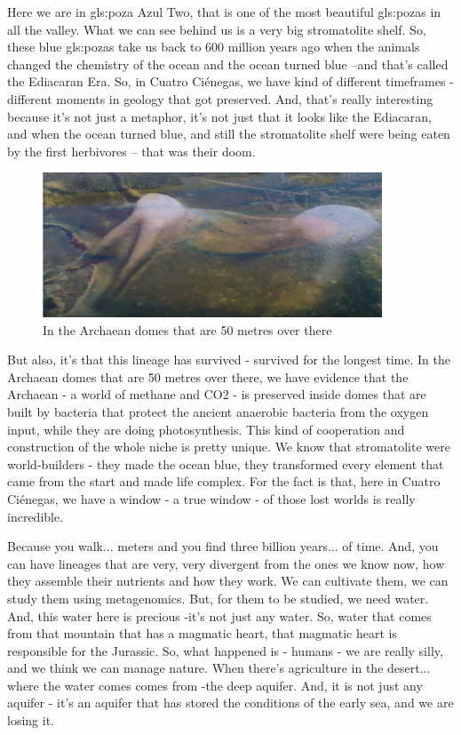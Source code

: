 \documentclass[]{article}
\begin{document}
Here we are in \Gls{gls:poza} Azul Two, that is one of the most beautiful \gls{gls:poza}s in all the valley. What we can see behind us is a very big stromatolite shelf. So, these blue \gls{gls:poza}s take us back to 600 million years ago when the animals changed the chemistry of the ocean and the ocean turned blue --and that's called the Ediacaran Era. So, in Cuatro  Ci\'enegas, we have kind of different timeframes - different moments in geology that got preserved. And, that's really interesting because it's not just a metaphor, it's not just that it looks like the Ediacaran, and when the ocean turned blue, and still the stromatolite shelf were being eaten by the first herbivores -- that was their doom.

\begin{figure}[h!]
	\caption{In the Archaean domes that are 50 metres over there} 
	\includegraphics[width=0.9\textwidth]{CuatroCienegas10}
\end{figure}
But also, it's that this lineage has survived - survived for the longest time. In the Archaean domes that are 50 metres over there, we have evidence that the Archaean - a world of methane and CO2 - is preserved inside domes that are built by bacteria that protect the ancient anaerobic bacteria from the oxygen input, while they are doing photosynthesis. This kind of cooperation and construction of the whole niche is pretty unique. We know that stromatolite were world-builders - they made the ocean blue, they transformed every element that came from the start and made life complex. For the fact is that, here in Cuatro  Ci\'enegas, we have a window - a true window - of those lost worlds is really incredible.

Because you walk... meters and you find three billion years... of time. And, you can have lineages that are very, very divergent from the ones we know now, how they assemble their nutrients and how they work. We can cultivate them, we can study them using metagenomics. But, for them to be studied, we need water. And, this water here is precious -it's not just any water. So, water that comes from that mountain that has a magmatic heart, that magmatic heart is responsible for the Jurassic. So, what happened is - humans - we are really silly, and we think we can manage nature. When there's agriculture in the desert... where the water comes comes from -the deep aquifer. And, it is not just any aquifer - it's an aquifer that has stored the conditions of the early sea, and we are losing it.
\end{document}
